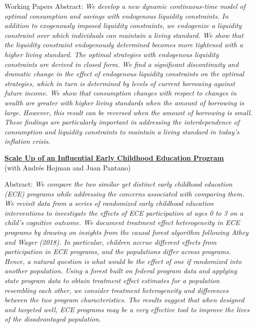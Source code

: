 \documentclass{resume} %
\begin{document}
\begin{rSection}{Working Papers}
		Abstract: \textit{We develop a new dynamic continuous-time model of optimal consumption and savings with endogenous liquidity constraints. In addition to exogenously imposed liquidity constraints, we endogenize a liquidity constraint over which individuals can maintain a living standard. We show that the liquidity constraint endogenously determined becomes more tightened with a higher living standard. The optimal strategies with endogenous liquidity constraints are derived in closed form. We find a significant discontinuity and dramatic change in the effect of endogenous liquidity constraints on the optimal strategies, which in turn is determined by levels of current borrowing against future income. We show that consumption changes with respect to changes in wealth are greater with higher living standards when the amount of borrowing is large. However, this result can be reversed when the amount of borrowing is small. These findings are particularly important in addressing the interdependence of consumption and liquidity constraints to maintain a living standard in today's inflation crisis.}
	
		\href{chanwoolkim.github.io}{\textbf{Scale Up of an Influential Early Childhood Education Program}} \\ (with Andr\'es Hojman and Juan Pantano)
		
		Abstract: \textit{We compare the two similar yet distinct early childhood education (ECE) programs while addressing the concerns associated with comparing them. We revisit data from a series of randomized early childhood education interventions to investigate the effects of ECE participation at ages 0 to 3 on a child's cognitive outcome. We document treatment effect heterogeneity in ECE programs by drawing on insights from the causal forest algorithm following Athey and Wager (2018). In particular, children accrue different effects from participation in ECE programs, and the populations differ across programs. Hence, a natural question is what would be the effect of one if randomized into another population. Using a forest built on federal program data and applying state program data to obtain treatment effect estimates for a population resembling each other, we consider treatment heterogeneity and differences between the two program characteristics. The results suggest that when designed and targeted well, ECE programs may be a very effective tool to improve the lives of the disadvantaged population.}
	\end{rSection}
	
\end{document}
